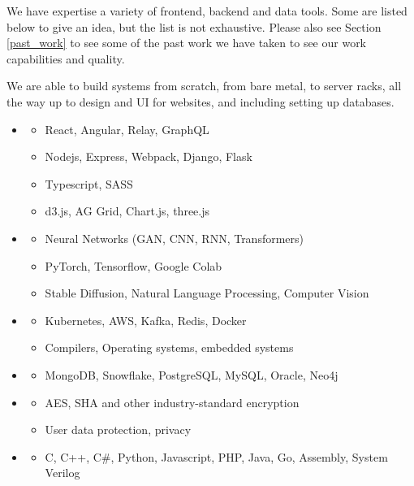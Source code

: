 We have expertise a variety of frontend, backend and data tools. Some are
listed below to give an idea, but the list is not exhaustive. Please also see
Section \ref{past_work} to see some of the past work we have taken to see our
work capabilities and quality.

We are able to build systems from scratch, from bare metal, to server racks,
all the way up to design and UI for websites, and including setting up
databases.

\begin{itemize}
  \item {}
  \begin{itemize}
    \item React, Angular, Relay, GraphQL
    \item Nodejs, Express, Webpack, Django, Flask
    \item Typescript, SASS
    \item d3.js, AG Grid, Chart.js, three.js
  \end{itemize}
  \item {}
  \begin{itemize}
    \item Neural Networks (GAN, CNN, RNN, Transformers)
    \item PyTorch, Tensorflow, Google Colab
    \item Stable Diffusion, Natural Language Processing, Computer Vision
  \end{itemize}
  \item {}
  \begin{itemize}
    \item Kubernetes, AWS, Kafka, Redis, Docker
    \item Compilers, Operating systems, embedded systems
  \end{itemize}
  \item {}
  \begin{itemize}
    \item MongoDB, Snowflake, PostgreSQL, MySQL, Oracle, Neo4j
  \end{itemize}
  \item {}
  \begin{itemize}
    \item AES, SHA and other industry-standard encryption
    \item User data protection, privacy
  \end{itemize}
  \item {}
  \begin{itemize}
    \item C, C++, C\#, Python, Javascript, PHP, Java, Go, Assembly, System Verilog
  \end{itemize}
\end{itemize}